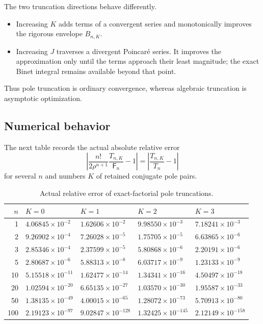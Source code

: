 \documentclass[11pt,a4paper,oneside]{article}
\theoremstyle{definition}
\theoremstyle{remark}
\newcommand{\Fub}{\mathsf{F}}
\begin{document}
\begin{interpretbox}
The two truncation directions behave differently.
\begin{itemize}
 \item Increasing $K$ adds terms of a convergent series and monotonically
       improves the rigorous envelope $B_{n,K}$.
 \item Increasing $J$ traverses a divergent Poincar\'e series.  It improves the
       approximation only until the terms approach their least magnitude;
       the exact Binet integral remains available beyond that point.
\end{itemize}
Thus pole truncation is ordinary convergence, whereas algebraic truncation is
asymptotic optimization.
\end{interpretbox}

\subsection{Numerical behavior}
The next table records the actual absolute relative error
\[
 \left|\frac{n!}{2\rho^{n+1}}\frac{T_{n,K}}{\Fub_n}-1\right|
 =\left|\frac{T_{n,K}}{T_n}-1\right|
\]
for several $n$ and numbers $K$ of retained conjugate pole pairs.

\begin{table}[htbp]
\centering
\caption{Actual relative error of exact-factorial pole truncations.}
\label{tab:pole-errors}
\small
\begin{tabular}{@{}rllll@{}}
\toprule
$n$ & $K=0$ & $K=1$ & $K=2$ & $K=3$\\
\midrule
1  & $4.06845\times 10^{-2}$ & $1.62606\times 10^{-2}$ & $9.98550\times 10^{-3}$ & $7.18241\times 10^{-3}$\\
2  & $9.26902\times 10^{-4}$ & $7.26028\times 10^{-5}$ & $1.75705\times 10^{-5}$ & $6.63865\times 10^{-6}$\\
3  & $2.85346\times 10^{-4}$ & $2.37599\times 10^{-5}$ & $5.80868\times 10^{-6}$ & $2.20191\times 10^{-6}$\\
5  & $2.80687\times 10^{-6}$ & $5.88313\times 10^{-8}$ & $6.03717\times 10^{-9}$ & $1.23133\times 10^{-9}$\\
10 & $5.15518\times 10^{-11}$ & $1.62477\times 10^{-14}$ & $1.34341\times 10^{-16}$ & $4.50497\times 10^{-18}$\\
20 & $1.02594\times 10^{-20}$ & $6.65135\times 10^{-27}$ & $1.03570\times 10^{-30}$ & $1.95587\times 10^{-33}$\\
50 & $1.38135\times 10^{-49}$ & $4.00015\times 10^{-65}$ & $1.28072\times 10^{-73}$ & $5.70913\times 10^{-80}$\\
100& $2.19123\times 10^{-97}$ & $9.02847\times 10^{-128}$& $1.32425\times 10^{-145}$& $2.12149\times 10^{-158}$\\
\bottomrule
\end{tabular}
\end{table}
\end{document}
